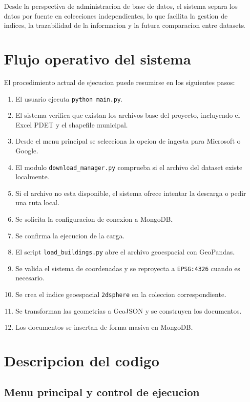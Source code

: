 \documentclass[12pt]{article}
\begin{document}
Desde la perspectiva de administracion de base de datos, el sistema separa los datos por fuente en colecciones independientes, lo que facilita la gestion de indices, la trazabilidad de la informacion y la futura comparacion entre datasets.

\section{Flujo operativo del sistema}

El procedimiento actual de ejecucion puede resumirse en los siguientes pasos:

\begin{enumerate}[leftmargin=*]
    \item El usuario ejecuta \texttt{python main.py}.
    \item El sistema verifica que existan los archivos base del proyecto, incluyendo el Excel PDET y el shapefile municipal.
    \item Desde el menu principal se selecciona la opcion de ingesta para Microsoft o Google.
    \item El modulo \texttt{download\_manager.py} comprueba si el archivo del dataset existe localmente.
    \item Si el archivo no esta disponible, el sistema ofrece intentar la descarga o pedir una ruta local.
    \item Se solicita la configuracion de conexion a MongoDB.
    \item Se confirma la ejecucion de la carga.
    \item El script \texttt{load\_buildings.py} abre el archivo geoespacial con GeoPandas.
    \item Se valida el sistema de coordenadas y se reproyecta a \texttt{EPSG:4326} cuando es necesario.
    \item Se crea el indice geoespacial \texttt{2dsphere} en la coleccion correspondiente.
    \item Se transforman las geometrias a GeoJSON y se construyen los documentos.
    \item Los documentos se insertan de forma masiva en MongoDB.
\end{enumerate}

\section{Descripcion del codigo}

\subsection{Menu principal y control de ejecucion}
\end{document}
